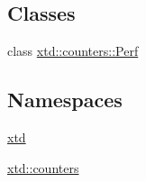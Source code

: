 \subsection*{Classes}
\begin{DoxyCompactItemize}
\item 
class \hyperlink{classxtd_1_1counters_1_1Perf}{xtd\+::counters\+::\+Perf}
\end{DoxyCompactItemize}
\subsection*{Namespaces}
\begin{DoxyCompactItemize}
\item 
 \hyperlink{namespacextd}{xtd}
\item 
 \hyperlink{namespacextd_1_1counters}{xtd\+::counters}
\end{DoxyCompactItemize}
